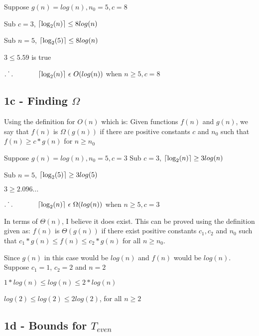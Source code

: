 \documentclass[oneside, a4paper]{article}
\DeclarePairedDelimiter\ceil{\lceil}{\rceil}
\begin{document}
\begin{center}
    Suppose $g(n) = log(n), n_0 = 5, c = 8$

    Sub $c = 3$, $\ceil{\log_2(n)} \leq 8log(n)$

    Sub $n = 5$, $\ceil{\log_2(5)}  \leq 8log(n)$

    $3 \leq 5.59$ is true

    $\dot{.\hspace{.095in}.}\hspace{.5in} \ceil{\log_2(n)} \text{ }\epsilon \text{ } O(log(n))$ when $n \geq 5, c = 8$
\end{center}

 
\subsection{1c - Finding $\Omega$}
Using the definition for $O(n)$ which is:
Given functions $f(n)$ and $g(n)$, we say that $f(n)$ is $\Omega(g(n))$ if there are positive constants $c$ and $n_0$ such that $f(n) \geq c * g(n)$ for $n \geq n_0$

\begin{center}
    Suppose $g(n) = log(n), n_0 = 5, c = 3$
    Sub $c = 3$, $\ceil{\log_2(n)} \geq 3log(n)$

    Sub $n = 5$, $\ceil{\log_2(5)} \geq 3log(5)$

    $3 \geq 2.096...$

    $\dot{.\hspace{.095in}.}\hspace{.5in} \ceil{\log_2(n)} \text{  }\epsilon \text{ } \Omega(log(n))$ when $n \geq 5, c = 3$
\end{center}

In terms of $\Theta(n)$, I believe it does exist. This can be proved using the definition given as:
$f(n)$ is $\Theta(g(n))$ if there exist positive constants $c_1, c_2$ and $n_0$ such that $c_1 * g(n) \leq f(n) \leq c_2 * g(n)$ for all $n \geq n_0$.

Since $g(n)$ in this case would be $log(n)$ and $f(n)$ would be $log(n)$. Suppose $c_1 = 1$, $c_2 = 2$ and $n = 2$

$1 * log(n) \leq log(n) \leq 2 * log(n)$ 

$log(2) \leq log(2) \leq 2log(2)$, for all $n \geq 2$

\subsection{1d - Bounds for $T_{even}$}
\end{document}

